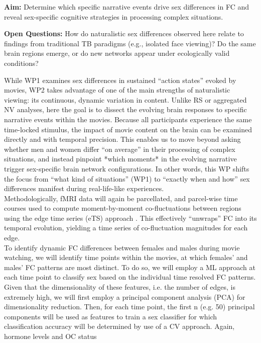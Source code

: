 \documentclass[11pt,a4paper]{article}
\begin{document}
\textbf{Aim:} Determine which specific narrative events drive sex differences in FC 
and reveal sex-specific cognitive strategies in processing complex situations.  

\textbf{Open Questions:} How do naturalistic sex differences observed here relate to findings 
from traditional TB paradigms (e.g., isolated face viewing)? Do the same brain regions emerge, 
or do new networks appear under ecologically valid conditions?  

While WP1 examines sex differences in sustained “action states” evoked by movies, 
WP2 takes advantage of one of the main strengths of naturalistic viewing: its continuous, 
dynamic variation in content. Unlike RS or aggregated NV analyses, here the goal is to dissect 
the evolving brain responses to specific narrative events within the movies. 
Because all participants experience the same time-locked stimulus, the impact of movie content on the 
brain can be examined directly and with temporal precision. This enables us to move beyond asking whether 
men and women differ “on average” in their processing of complex situations, and 
instead pinpoint *which moments* in the evolving narrative trigger sex-specific brain network configurations. 
In other words, this WP shifts the focus from “what kind of situations” (WP1) to “exactly when and how” 
sex differences manifest during real-life-like experiences.\\  
Methodologically, fMRI data will again be parcellated, and parcel-wise time courses used to compute 
moment-by-moment co-fluctuations between regions using the edge time series (eTS) approach 
\parencite{betzelLivingEdgeNetwork2023a,faskowitzEdgecentricFunctionalNetwork2020a}. 
This effectively “unwraps” FC into its temporal evolution, yielding a time series of 
co-fluctuation magnitudes for each edge.\\
To identify dynamic FC differences between females and males during movie watching, we will identify
time points within the movies, at which females' and males' FC patterns are most distinct. To do so, we
will employ a ML approach at each time point to classify sex based on the individual time resolved FC
patterns. Given that the dimensionality of these features, i.e. the number of edges, is extremely high, we
will first employ a principal component analysis (PCA) for dimensionality reduction. Then, for each time
point, the first n (e.g. 50) principal components will be used as features to train a sex classifier for which
classification accuracy will be determined by use of a CV approach. Again, hormone levels and OC status
\end{document}
